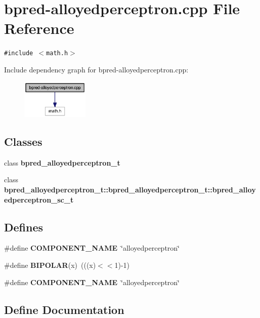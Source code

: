 \section{bpred-alloyedperceptron.cpp File Reference}
\label{bpred-alloyedperceptron_8cpp}
{\tt \#include $<$math.h$>$}\par


Include dependency graph for bpred-alloyedperceptron.cpp:\nopagebreak
\begin{figure}[H]
\begin{center}
\leavevmode
\includegraphics[width=91pt]{bpred-alloyedperceptron_8cpp__incl}
\end{center}
\end{figure}
\subsection*{Classes}
\begin{CompactItemize}
\item 
class {\bf bpred\_\-alloyedperceptron\_\-t}
\item 
class {\bf bpred\_\-alloyedperceptron\_\-t::bpred\_\-alloyedperceptron\_\-t::bpred\_\-alloyedperceptron\_\-sc\_\-t}
\end{CompactItemize}
\subsection*{Defines}
\begin{CompactItemize}
\item 
\#define {\bf COMPONENT\_\-NAME}~\char`\"{}alloyedperceptron\char`\"{}
\item 
\#define {\bf BIPOLAR}(x)~(((x)$<$$<$1)-1)
\item 
\#define {\bf COMPONENT\_\-NAME}~\char`\"{}alloyedperceptron\char`\"{}
\end{CompactItemize}


\subsection{Define Documentation}
